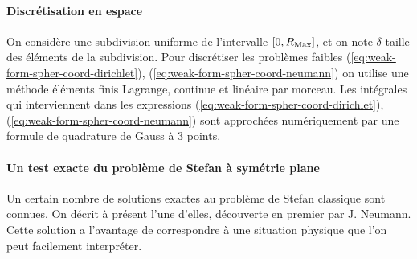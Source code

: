 \paragraph{Discrétisation en espace}
On considère une subdivision uniforme de l'intervalle $[0, R_\mathrm{Max}]$, et
on note $\delta$ taille des éléments de la subdivision. Pour
discrétiser les problèmes faibles
(\ref{eq:weak-form-spher-coord-dirichlet}),
(\ref{eq:weak-form-spher-coord-neumann}) on utilise une méthode
éléments finis Lagrange, continue et linéaire par morceau. Les
intégrales qui interviennent dans les expressions
(\ref{eq:weak-form-spher-coord-dirichlet}),
(\ref{eq:weak-form-spher-coord-neumann}) sont approchées numériquement
par une formule de quadrature de Gauss à 3 points.



\paragraph{Un test exacte du problème de Stefan à symétrie plane}
Un certain nombre de solutions exactes au problème de Stefan
classique sont connues. On décrit à présent l'une d'elles, découverte en
premier par J. Neumann. Cette solution a l'avantage de correspondre à
une situation physique que l'on peut facilement interpréter.

